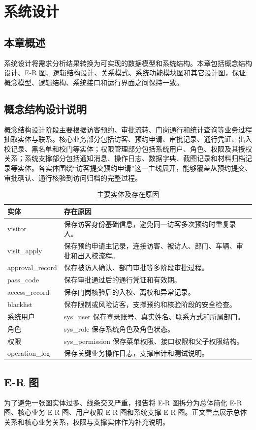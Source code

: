 \section{系统设计}
\subsection{本章概述}
系统设计将需求分析结果转换为可实现的数据模型和系统结构。本章包括概念结构设计、E-R 图、逻辑结构设计、关系模式、系统功能模块图和其它设计图，保证概念模型、逻辑结构、系统接口和运行界面之间保持一致。

\subsection{概念结构设计说明}
概念结构设计阶段主要根据访客预约、审批流转、门岗通行和统计查询等业务过程抽取实体与联系。核心业务部分包括访客、预约申请、审批记录、通行凭证、出入校记录、黑名单和校门等实体；权限管理部分包括系统用户、角色、权限及其授权关系；系统支撑部分包括通知消息、操作日志、数据字典、截图记录和材料归档记录等实体。各实体围绕“访客提交预约申请”这一主线展开，能够覆盖从预约提交、审批确认、通行核验到访问归档的完整过程。
\begin{longtable}{>{\raggedright\arraybackslash}p{}>{\raggedright\arraybackslash}p{}}
\caption{主要实体及存在原因}\\
\toprule
实体 & 存在原因 \\
\midrule
visitor & 保存访客身份基础信息，避免同一访客多次预约时重复录入。 \\
visit\_apply & 保存预约申请主记录，连接访客、被访人、部门、车辆、审批和出入校流程。 \\
approval\_record & 保存被访人确认、部门审批等多阶段审批过程。 \\
pass\_code & 保存审批通过后的通行凭证和有效期。 \\
access\_record & 保存门岗核验后的入校、离校和异常记录。 \\
blacklist & 保存限制或风险访客，支撑预约和核验阶段的安全检查。 \\
系统用户 & sys\_user 保存登录账号、真实姓名、联系方式和所属部门。 \\
角色 & sys\_role 保存系统角色及角色状态。 \\
权限 & sys\_permission 保存菜单权限、接口权限和父子权限结构。 \\
operation\_log & 保存关键业务操作日志，支撑审计和测试说明。 \\
\bottomrule
\end{longtable}
\subsection{E-R 图}
为了避免一张图实体过多、线条交叉严重，报告将 E-R 图拆分为总体简化 E-R 图、核心业务 E-R 图、用户权限 E-R 图和系统支撑 E-R 图。正文重点展示总体关系和核心业务关系，权限与支撑实体作为补充说明。
